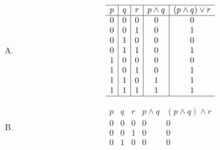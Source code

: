 {{\begin{practices}
\begin{enumerate}[A.]
{\begin{table}[H]
\[\begin{array}{c|c|c|c|c}
                                1 & 1 & 0 & 1 & 0 \\
                                1 & 1 & 1 & 1 & 1 \\
                                \hline
                            \end{array}
                        \]
                    \end{table}
                }
                \item
                {
                    \begin{table}[H]
                        \[
                            \begin{array}{c|c|c|c|c}
                                \hline
                                p & q & r & p \wedge q & (p \wedge q) \vee r \\
                                \hline
                                0 & 0 & 0 & 0 & 0 \\
                                0 & 0 & 1 & 0 & 1 \\
                                0 & 1 & 0 & 0 & 0 \\
                                0 & 1 & 1 & 0 & 1 \\
                                1 & 0 & 0 & 0 & 0 \\
                                1 & 0 & 1 & 0 & 1 \\
                                1 & 1 & 0 & 1 & 1 \\
                                1 & 1 & 1 & 1 & 1 \\
                                \hline
                            \end{array}
                        \]
                    \end{table}
                }
                \item
                {
                    \begin{table}[H]
                        \[
                            \begin{array}{c|c|c|c|c}
                                \hline
                                p & q & r & p \wedge q & (p \wedge q) \wedge r \\
                                \hline
                                0 & 0 & 0 & 0 & 0 \\
                                0 & 0 & 1 & 0 & 0 \\
                                0 & 1 & 0 & 0 & 0 \\

\end{array}\]
\end{table}}
\end{enumerate}
\end{practices}}}
